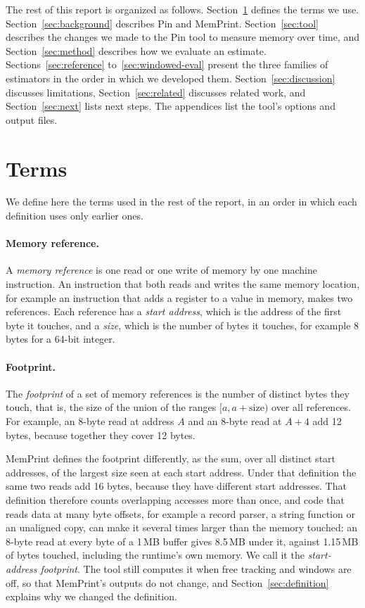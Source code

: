\documentclass[11pt]{article}
\newcommand{\memprint}{MemPrint}
\newcommand{\secref}[1]{Section~\ref{#1}}
\newcommand{\term}[1]{\emph{#1}}
\begin{document}
The rest of this report is organized as follows. \secref{sec:terms} defines the terms we use. \secref{sec:background} describes Pin and \memprint{}. \secref{sec:tool} describes the changes we made to the Pin tool to measure memory over time, and \secref{sec:method} describes how we evaluate an estimate. Sections~\ref{sec:reference} to~\ref{sec:windowed-eval} present the three families of estimators in the order in which we developed them. \secref{sec:discussion} discusses limitations, \secref{sec:related} discusses related work, and \secref{sec:next} lists next steps. The appendices list the tool's options and output files.

\section{Terms}
\label{sec:terms}

We define here the terms used in the rest of the report, in an order in which each definition uses only earlier ones.

\paragraph{Memory reference.}
A \term{memory reference} is one read or one write of memory by one machine instruction. An instruction that both reads and writes the same memory location, for example an instruction that adds a register to a value in memory, makes two references. Each reference has a \term{start address}, which is the address of the first byte it touches, and a \term{size}, which is the number of bytes it touches, for example 8 bytes for a 64-bit integer.

\paragraph{Footprint.}
The \term{footprint} of a set of memory references is the number of distinct bytes they touch, that is, the size of the union of the ranges $[a, a + \text{size})$ over all references. For example, an 8-byte read at address $A$ and an 8-byte read at $A+4$ add 12 bytes, because together they cover 12 bytes.

\memprint{} defines the footprint differently, as the sum, over all distinct start addresses, of the largest size seen at each start address. Under that definition the same two reads add 16 bytes, because they have different start addresses. That definition therefore counts overlapping accesses more than once, and code that reads data at many byte offsets, for example a record parser, a string function or an unaligned copy, can make it several times larger than the memory touched: an 8-byte read at every byte of a 1\,MB buffer gives 8.5\,MB under it, against 1.15\,MB of bytes touched, including the runtime's own memory. We call it the \term{start-address footprint}. The tool still computes it when free tracking and windows are off, so that \memprint{}'s outputs do not change, and \secref{sec:definition} explains why we changed the definition.
\end{document}
